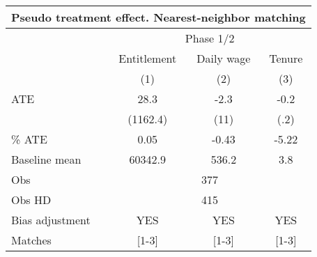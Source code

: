 \begin{tabular}{lccc}
\toprule
\multicolumn{4}{c}{Pseudo treatment effect. Nearest-neighbor matching} \\
\midrule
\midrule
      & \multicolumn{3}{c}{Phase 1/2} \\
\midrule
\midrule
      & Entitlement & Daily wage & Tenure \\
\midrule
\midrule
      & (1)   & (2)   & (3) \\
\midrule
ATE   & 28.3  & -2.3  & -0.2 \\
      & (1162.4) & (11)  & (.2) \\
\% ATE & 0.05  & -0.43 & -5.22 \\
Baseline mean & 60342.9 & 536.2 & 3.8 \\
Obs   & \multicolumn{3}{c}{377} \\
Obs HD & \multicolumn{3}{c}{415} \\
Bias adjustment & YES   & YES   & YES \\
Matches & [1-3] & [1-3] & [1-3] \\
\bottomrule
\bottomrule
\end{tabular}%
